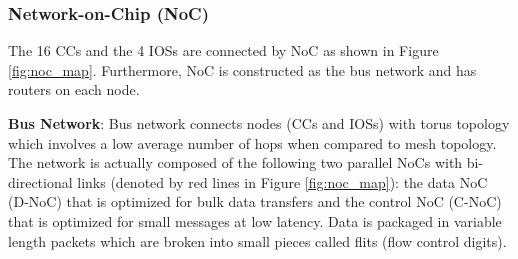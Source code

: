 \documentclass[conference,compsoc]{IEEEtran}
\newcommand{\comment}[1]{}
\begin{document}


\vspace{-2mm}
\subsubsection{Network-on-Chip (NoC)}
\label{sec:noc}
The 16 CCs and the 4 IOSs are connected by NoC as shown in Figure \ref{fig:noc_map}.
Furthermore, NoC is constructed \comment{1-12} as the bus network and has routers on each node.

\textbf{Bus Network}:
Bus network connects nodes (CCs and IOSs) with torus topology \cite{dally2001route}
which \comment{1-13} involves a low average number of hops when compared to mesh topology.
The network is actually composed of the following two parallel NoCs with bi-directional links (denoted by red lines in Figure \ref{fig:noc_map}):
the data NoC (D-NoC) that is optimized for bulk data transfers and the control NoC (C-NoC) that is optimized for small messages at low latency.
Data is packaged in variable length packets which are broken into small pieces called flits (flow control digits).
\end{document}
